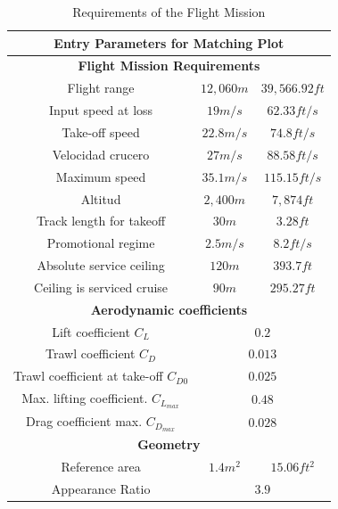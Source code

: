 \begin{table}[!h]
    \caption{Requirements of the Flight Mission}
    \centering
    \begin{tabular}{|c|c|c|}
    \hline
    \multicolumn{3}{|c|}{\textbf{Entry Parameters for Matching Plot} } \\
    \hline
    \multicolumn{3}{|c|}{\textbf{Flight Mission Requirements}} \\
    \hline
    Flight range & $12, 060 m$ & $39, 566.92 ft$ \\
    \hline
    Input speed at loss & $19 m/s$ & $62.33 ft/s$  \\
    \hline
    Take-off speed &  $22.8 m/s$ & $74.8 ft/s$ \\
    \hline
    Velocidad crucero & $27 m/s$ & $88.58 ft/s$ \\
    \hline
    Maximum speed & $35.1 m/s$ & $115.15 ft/s$ \\
    \hline
    Altitud & $2, 400 m$ & $7, 874 ft$\\
    \hline
    Track length for takeoff & $30 m$ & $3.28 ft$ \\
    \hline
    Promotional regime & $2.5 m/s$ & $8.2 ft/s$ \\
    \hline
    Absolute service ceiling & $120 m$ & $393.7 ft$ \\
    \hline
    Ceiling is serviced cruise & $90 m$ & $295.27 ft$ \\
    \hline
    \multicolumn{3}{|c|}{\textbf{Aerodynamic coefficients}} \\
    \hline
    Lift coefficient $C_L$ & \multicolumn{2}{|c|}{$0.2$} \\
    \hline
    Trawl coefficient $C_D$ & \multicolumn{2}{|c|}{$0.013$}  \\
    \hline
    Trawl coefficient at take-off $C_{D0}$ & \multicolumn{2}{|c|}{$0.025$} \\
    \hline
    Max. lifting coefficient. $C_{L_{max}}$ & \multicolumn{2}{|c|}{$0.48$} \\
    \hline
    Drag coefficient max. $C_{D_{max}}$ & \multicolumn{2}{|c|}{$0.028$}  \\
    \hline
    \multicolumn{3}{|c|}{\textbf{Geometry}} \\
    \hline
    Reference area & $1.4m^2$ & $15.06 ft^2$ \\
    \hline
    Appearance Ratio & \multicolumn{2}{|c|}{$3.9$} \\
    \hline
    \end{tabular}
    \label{Requerimientos de la misión de vuelo}
\end{table}

